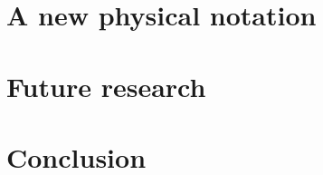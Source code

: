 \documentclass{llncs}
\begin{document}
\section{A new physical notation}
\label{sec-notation}


\section{Future research}
\label{sec-future}


\section{Conclusion}
\label{sec-conclusion}





\end{document}
